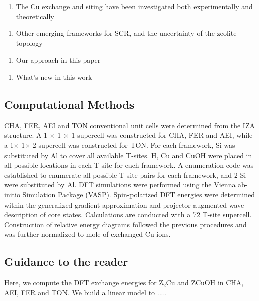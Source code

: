 \documentclass[12pt]{article}
\begin{document}
\begin{enumerate}[resume]
\item The Cu exchange and siting have been investigated both experimentally and theoretically
\end{enumerate}

\begin{enumerate}[resume]
\item Other emerging frameworks for SCR, and the uncertainty of the zeolite topology
\end{enumerate}

\begin{enumerate}[resume]
\item Our approach in this paper
\end{enumerate}

\begin{enumerate}[resume]
\item What's new in this work
\end{enumerate}

\subsection*{Computational Methods}

CHA, FER, AEI and TON conventional unit cells were determined from the IZA structure. A 1 $\times$ 1 $\times$ 1 supercell was constructed for CHA, FER and AEI, while a 1$\times$ 1$\times$ 2 supercell was constructed for TON. For each framework, Si was  substituted by Al to cover all available T-sites. H, Cu and CuOH were placed in all possible locations in each T-site for each framework. A enumeration code was established to enumerate all possible T-site pairs for each framework, and 2 Si were substituted by Al. DFT simulations were performed using the Vienna ab-initio Simulation Package (VASP). Spin-polarized DFT energies were determined within the generalized gradient approximation and projector-augmented wave description of core states. Calculations are conducted with a 72 T-site supercell. Construction of relative energy diagrams followed the previous procedures \cite{Paolucci2016} and was further normalized to mole of exchanged Cu ions.



\subsection*{Guidance to the reader}
Here, we compute the DFT exchange energies for Z$_{2}$Cu and ZCuOH in CHA, AEI, FER and TON. We build a linear model to .....
\end{document}
